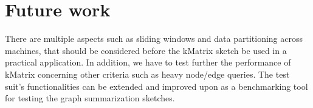 \section{Future work}

There are multiple aspects such as sliding windows and data partitioning across machines, that should be considered before the kMatrix sketch be used in a practical application. In addition, we have to test further the performance of kMatrix concerning other criteria such as heavy node/edge queries. The test suit’s functionalities can be extended and improved upon as a benchmarking tool for testing the graph summarization sketches. 